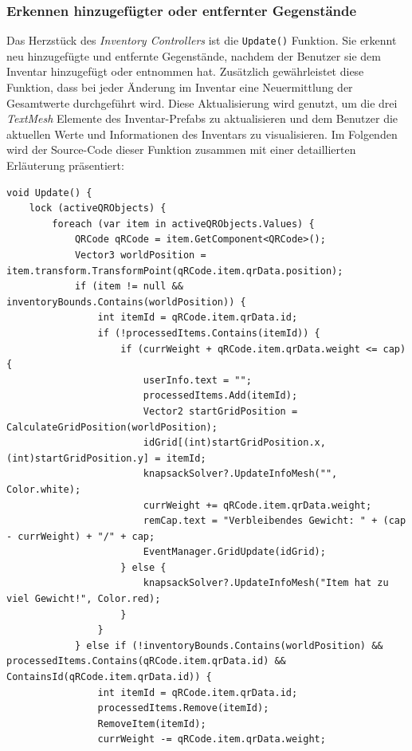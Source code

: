 \begin{itemize}
\subsubsection{\label{sec:moritsInventarBounds}Erkennen hinzugefügter oder entfernter Gegenstände}
Das Herzstück des \textit{Inventory Controllers} ist die \texttt{Update()} Funktion. Sie erkennt neu hinzugefügte und
entfernte Gegenstände, nachdem der Benutzer sie dem Inventar hinzugefügt oder entnommen hat. Zusätzlich gewährleistet
diese Funktion, dass bei jeder Änderung im Inventar eine Neuermittlung der Gesamtwerte durchgeführt wird. Diese Aktualisierung
wird genutzt, um die drei \textit{TextMesh} Elemente des Inventar-Prefabs zu aktualisieren und dem Benutzer die aktuellen
Werte und Informationen des Inventars zu visualisieren. Im Folgenden wird der Source-Code dieser Funktion zusammen mit
einer detaillierten Erläuterung präsentiert:
\begin{lstlisting}[style=csharp, caption={Neue / Entfernte Items erkennen}, label=code:controller_updateGrid]
void Update() {
    lock (activeQRObjects) {
        foreach (var item in activeQRObjects.Values) {
            QRCode qRCode = item.GetComponent<QRCode>();
            Vector3 worldPosition = item.transform.TransformPoint(qRCode.item.qrData.position);
            if (item != null && inventoryBounds.Contains(worldPosition)) {
                int itemId = qRCode.item.qrData.id;
                if (!processedItems.Contains(itemId)) {
                    if (currWeight + qRCode.item.qrData.weight <= cap) {
                        userInfo.text = "";
                        processedItems.Add(itemId);
                        Vector2 startGridPosition = CalculateGridPosition(worldPosition);
                        idGrid[(int)startGridPosition.x, (int)startGridPosition.y] = itemId;
                        knapsackSolver?.UpdateInfoMesh("", Color.white);
                        currWeight += qRCode.item.qrData.weight;
                        remCap.text = "Verbleibendes Gewicht: " + (cap - currWeight) + "/" + cap;
                        EventManager.GridUpdate(idGrid);
                    } else {
                        knapsackSolver?.UpdateInfoMesh("Item hat zu viel Gewicht!", Color.red);
                    }
                }
            } else if (!inventoryBounds.Contains(worldPosition) && processedItems.Contains(qRCode.item.qrData.id) && ContainsId(qRCode.item.qrData.id)) {
                int itemId = qRCode.item.qrData.id;
                processedItems.Remove(itemId);
                RemoveItem(itemId);
                currWeight -= qRCode.item.qrData.weight;

\end{lstlisting}
\end{itemize}
